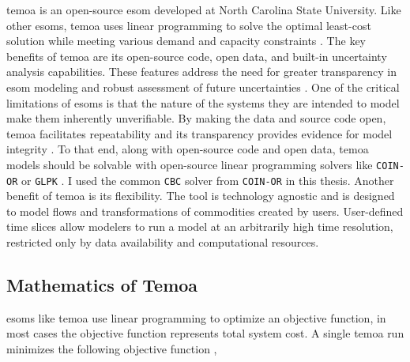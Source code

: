 \gls{temoa} is an open-source \gls{esom} developed at North Carolina State University.
Like other \glspl{esom}, \gls{temoa} uses linear programming to solve the optimal
least-cost solution while meeting various demand and capacity constraints \cite{hunter_modeling_2013}.
The key benefits of \gls{temoa} are its open-source code, open data, and built-in
uncertainty analysis capabilities. These features address the need for greater
transparency in \gls{esom} modeling and robust assessment of future uncertainties
\cite{hunter_modeling_2013}. One of the critical limitations of \glspl{esom} is that
the nature of the systems they are intended to model make them inherently
unverifiable. By making the data and source code open,
\gls{temoa} facilitates repeatability and its transparency provides evidence for
model integrity
\cite{decarolis_case_2012}. To that end, along with open-source code and open data,
\gls{temoa} models should be solvable
with open-source linear programming solvers like \texttt{COIN-OR} \cite{noauthor_coin-or_nodate} or \texttt{GLPK} \cite{noauthor_glpk_nodate}. I used the common
\texttt{CBC} solver from \texttt{COIN-OR} \cite{noauthor_cbc_2021} in this thesis.
Another benefit of \gls{temoa} is its flexibility.
The tool is technology agnostic and is designed to model flows and transformations
of commodities created by users.
User-defined time slices allow modelers to run a model at an arbitrarily high
time resolution, restricted only by data availability and computational resources.

\subsection{Mathematics of Temoa}
\glspl{esom} like \gls{temoa} use linear programming to optimize an objective
function, in most cases the objective function represents total system cost.
A single \gls{temoa} run minimizes the following objective function \cite{noauthor_preface_nodate},


